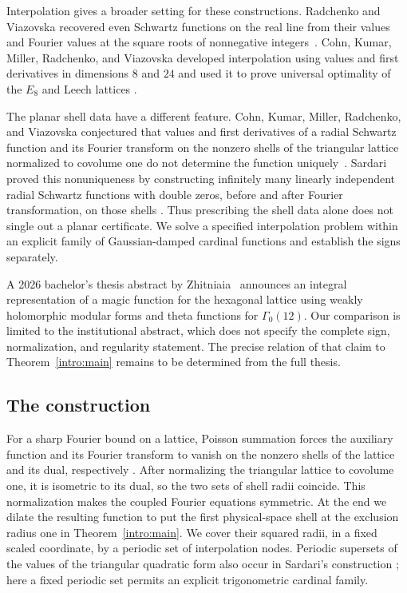 Interpolation gives a broader setting for these constructions.
Radchenko and Viazovska recovered even Schwartz functions on the real
line from their values and Fourier values at the square roots of
nonnegative integers~\cite[Theorem~1]{RadchenkoViazovska2019}.
Cohn, Kumar, Miller, Radchenko, and Viazovska developed interpolation
using values and first derivatives in dimensions $8$ and $24$ and used
it to prove universal optimality of the $E_8$ and Leech lattices
\cite[Theorems~1.4, 1.7, and~1.9]{CKMRV2022}.

The planar shell data have a different feature.
Cohn, Kumar, Miller, Radchenko, and Viazovska conjectured that values
and first derivatives of a radial Schwartz function and its Fourier
transform on the nonzero shells of the triangular lattice normalized to
covolume one do not determine
the function uniquely~\cite[Conjecture~7.5]{CKMRV2022}.
Sardari proved this nonuniqueness by constructing infinitely many
linearly independent radial Schwartz functions with double zeros,
before and after Fourier transformation, on those shells
\cite[Theorem~1.7]{Sardari2021}.
Thus prescribing the shell data alone does not single out a planar
certificate. We solve a specified interpolation problem within an
explicit family of Gaussian-damped cardinal functions and establish
the signs separately.

A 2026 bachelor's thesis abstract by Zhitniaia~\cite{Zhitniaia2026}
announces an integral representation of a magic function for the
hexagonal lattice using weakly holomorphic modular forms and theta
functions for $\Gamma_0(12)$. Our comparison is limited to the
institutional abstract, which does not specify the complete sign,
normalization, and regularity statement. The precise relation of that
claim to Theorem~\ref{intro:main} remains to be determined from the
full thesis.

\subsection{The construction}

For a sharp Fourier bound on a lattice, Poisson summation forces
the auxiliary function and its Fourier transform to vanish on the
nonzero shells of the lattice and its dual, respectively
\cite[Section~5]{CohnElkies2003}.
After normalizing the triangular lattice to covolume one, it is
isometric to its dual, so the two sets of shell radii coincide.
This normalization makes the coupled Fourier equations symmetric.
At the end we dilate the resulting function to put the first
physical-space shell at the exclusion radius one in
Theorem~\ref{intro:main}.
We cover their squared radii, in a fixed scaled coordinate, by a
periodic set of interpolation nodes.
Periodic supersets of the values of the triangular quadratic form
also occur in Sardari's construction
\cite[Section~6.1]{Sardari2021}; here a fixed periodic set permits
an explicit trigonometric cardinal family.

